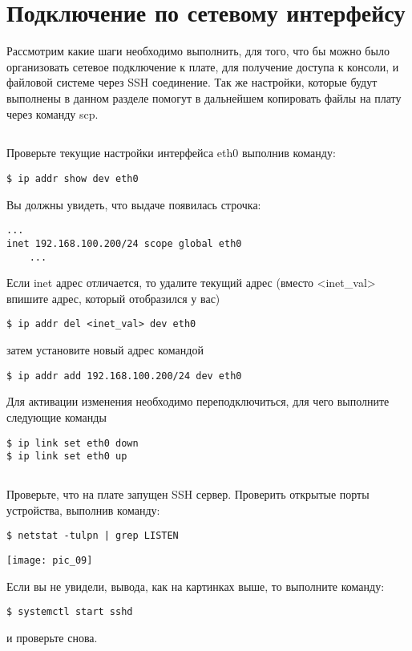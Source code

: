 \section{Подключение по сетевому интерфейсу}

Рассмотрим какие шаги необходимо выполнить, для того, что бы можно было организовать сетевое подключение к плате, для получение доступа к консоли, и файловой системе через SSH соединение. Так же настройки, которые будут выполнены в данном разделе помогут в дальнейшем копировать файлы на плату через команду scp.

\subsection{}Проверьте текущие настройки интерфейса eth0 выполнив команду: 
\begin{lstlisting}[style=bash]
$ ip addr show dev eth0 
\end{lstlisting}
Вы должны увидеть, что выдаче появилась строчка: 
\begin{lstlisting}[style=stdout]
	...
inet 192.168.100.200/24 scope global eth0 
	...
\end{lstlisting}
Если inet адрес отличается, то удалите текущий адрес (вместо <inet\_val> впишите адрес, который отобразился у вас)
\begin{lstlisting}[style=bash]
$ ip addr del <inet_val> dev eth0
\end{lstlisting}
затем установите новый адрес командой 
\begin{lstlisting}[style=bash]
$ ip addr add 192.168.100.200/24 dev eth0
\end{lstlisting} 
Для активации изменения необходимо переподключиться, для чего выполните следующие команды
\begin{lstlisting}[style=bash]
$ ip link set eth0 down
$ ip link set eth0 up
\end{lstlisting} 

\subsection{}Проверьте, что на плате запущен SSH сервер. Проверить открытые порты устройства, выполнив команду: 

\begin{lstlisting}[style=bash]
$ netstat -tulpn | grep LISTEN
\end{lstlisting} 
\begin{center}
	\texttt{[image: pic\_09]}
\end{center}
Если вы не увидели, вывода, как на картинках выше, то выполните команду: 
\begin{lstlisting}[style=bash]
$ systemctl start sshd 
\end{lstlisting}
и проверьте снова. 

